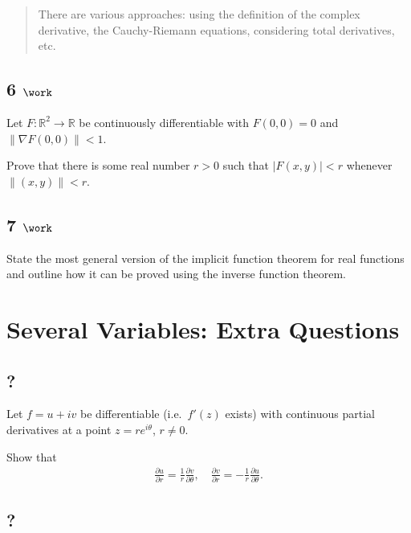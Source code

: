 \begin{quote}
There are various approaches: using the definition of the complex
derivative, the Cauchy-Riemann equations, considering total derivatives,
etc.
\end{quote}

\hypertarget{work-15}{%
\subsection{\texorpdfstring{6
\(\work\)}{6 \textbackslash work}}\label{work-15}}

Let \(F:{\mathbb{R}}^2\to {\mathbb{R}}\) be continuously differentiable
with \(F(0, 0) = 0\) and
\({\left\lVert {\nabla F(0, 0)} \right\rVert} < 1\).

Prove that there is some real number \(r> 0\) such that
\({\left\lvert {F(x, y)} \right\rvert} < r\) whenever
\({\left\lVert {(x, y)} \right\rVert} < r\).

\hypertarget{work-16}{%
\subsection{\texorpdfstring{7
\(\work\)}{7 \textbackslash work}}\label{work-16}}

State the most general version of the implicit function theorem for real
functions and outline how it can be proved using the inverse function
theorem.

\hypertarget{several-variables-extra-questions}{%
\section{Several Variables: Extra
Questions}\label{several-variables-extra-questions}}

\hypertarget{section}{%
\subsection{?}\label{section}}

Let \(f=u+iv\) be differentiable (i.e.~\(f'(z)\) exists) with continuous
partial derivatives at a point \(z=re^{i\theta}\), \(r\not= 0\).

Show that
\begin{align*}
\frac{\partial u}{\partial r}=\frac{1}{r}\frac{\partial v}{\partial \theta},\quad
\frac{\partial v}{\partial r}=-\frac{1}{r}\frac{\partial u}{\partial \theta}
.\end{align*}

\hypertarget{section-1}{%
\subsection{?}\label{section-1}}

